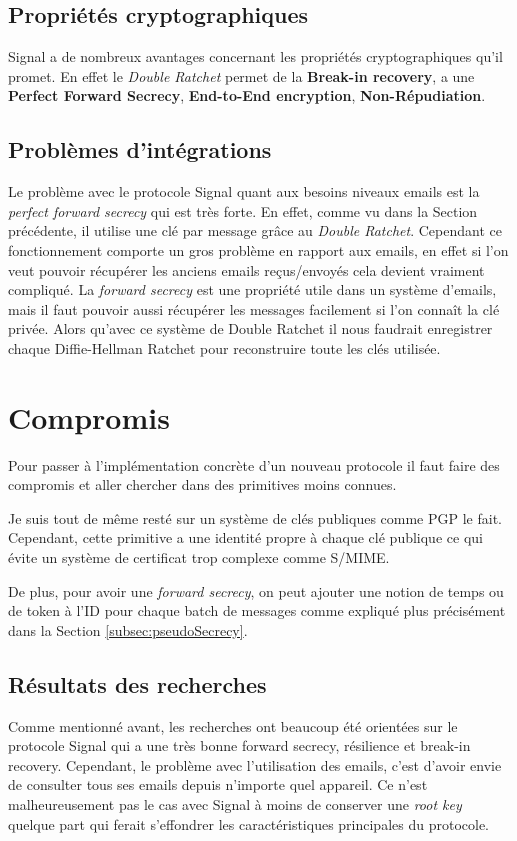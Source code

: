 \subsection{Propriétés cryptographiques}
Signal a de nombreux avantages concernant les propriétés cryptographiques qu'il promet. En effet le \textit{Double Ratchet} permet de la \textbf{Break-in recovery}, a une \textbf{Perfect Forward Secrecy}, \textbf{End-to-End encryption}, \textbf{Non-Répudiation}.
\subsection{Problèmes d'intégrations}
Le problème avec le protocole Signal quant aux besoins niveaux emails est la \textit{perfect forward secrecy} qui est très forte. En effet, comme vu dans la Section précédente, il utilise une clé par message grâce au \textit{Double Ratchet}. Cependant ce fonctionnement comporte un gros problème en rapport aux emails, en effet si l'on veut pouvoir récupérer les anciens emails reçus/envoyés cela devient vraiment compliqué. La \textit{forward secrecy} est une propriété utile dans un système d'emails, mais il faut pouvoir aussi récupérer les messages facilement si l'on connaît la clé privée. Alors qu'avec ce système de Double Ratchet il nous faudrait enregistrer chaque Diffie-Hellman Ratchet pour reconstruire toute les clés utilisée.
\section{Compromis}
Pour passer à l'implémentation concrète d'un nouveau protocole il faut faire des compromis et aller chercher dans des primitives moins connues.

Je suis tout de même resté sur un système de clés publiques comme PGP le fait. Cependant, cette primitive a une identité propre à chaque clé publique ce qui évite un système de certificat trop complexe comme S/MIME.

De plus, pour avoir une \textit{forward secrecy}, on peut ajouter une notion de temps ou de token à l'ID pour chaque batch de messages comme expliqué plus précisément dans la Section \ref{subsec:pseudoSecrecy}.
\subsection{Résultats des recherches}
Comme mentionné avant, les recherches ont beaucoup été orientées sur le protocole Signal qui a une très bonne forward secrecy, résilience et break-in recovery. Cependant, le problème avec l'utilisation des emails, c'est d'avoir envie de consulter tous ses emails depuis n'importe quel appareil. Ce n'est malheureusement pas le cas avec Signal à moins de conserver une \textit{root key} quelque part qui ferait s'effondrer les caractéristiques principales du protocole.

